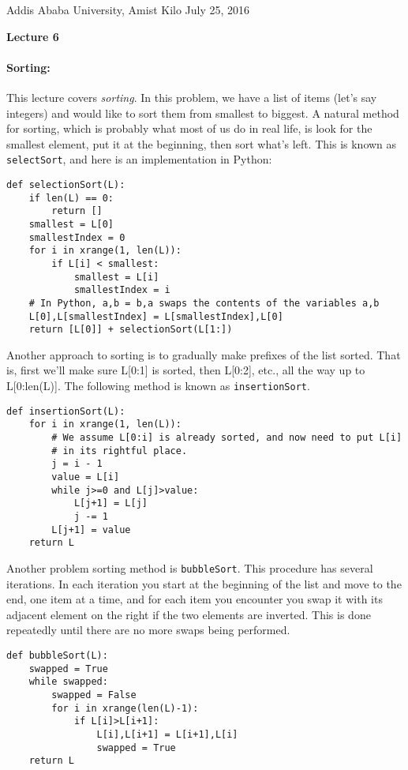 \documentclass[11pt]{article}
\newlength{\toppush}
\newcommand{\htitle}[2]{\noindent\vspace*{-\toppush}\newline\parbox{6.5in}
 {\large Addis Ababa University, Amist Kilo \hfill #1\newline
\hspace*{\fill}{\bf Algorithms and Programming for High Schoolers} \hspace*{\fill} \newline
\mbox{}\hrulefill\mbox{}}\vspace*{1ex}\mbox{}\newline
\begin{center}{\Large\bf #2}\end{center}}
\begin{document}
\htitle{July 25, 2016}{Lecture 6}

\paragraph{\Large Sorting:}

This lecture covers {\em sorting}.  In this problem, we have a list of
items (let's say integers) and would like to sort them from smallest
to biggest.  A natural method for sorting, which is probably what most
of us do in real life, is look for the smallest element, put it at the
beginning, then sort what's left.  This is known as
\texttt{selectSort}, and here is an implementation in Python:

\begin{verbatim}
def selectionSort(L):
    if len(L) == 0: 
        return []
    smallest = L[0]
    smallestIndex = 0
    for i in xrange(1, len(L)):
        if L[i] < smallest:
            smallest = L[i]
            smallestIndex = i
    # In Python, a,b = b,a swaps the contents of the variables a,b
    L[0],L[smallestIndex] = L[smallestIndex],L[0]
    return [L[0]] + selectionSort(L[1:])
\end{verbatim}

Another approach to sorting is to gradually make prefixes of the list
sorted.  That is, first we'll make sure L[0:1] is sorted, then L[0:2],
etc., all the way up to L[0:len(L)].  The following method is known as
\texttt{insertionSort}.

\begin{verbatim}
def insertionSort(L):
    for i in xrange(1, len(L)):
        # We assume L[0:i] is already sorted, and now need to put L[i]
        # in its rightful place.
        j = i - 1
        value = L[i]
        while j>=0 and L[j]>value:
            L[j+1] = L[j]
            j -= 1
        L[j+1] = value
    return L
\end{verbatim}

Another problem sorting method is \texttt{bubbleSort}.  This procedure
has several iterations.  In each iteration you start at the beginning
of the list and move to the end, one item at a time, and for each item
you encounter you swap it with its adjacent element on the right if
the two elements are inverted.  This is done repeatedly until there
are no more swaps being performed.

\begin{verbatim}
def bubbleSort(L):
    swapped = True
    while swapped:
        swapped = False
        for i in xrange(len(L)-1):
            if L[i]>L[i+1]:
                L[i],L[i+1] = L[i+1],L[i]
                swapped = True
    return L
\end{verbatim}
\end{document}
